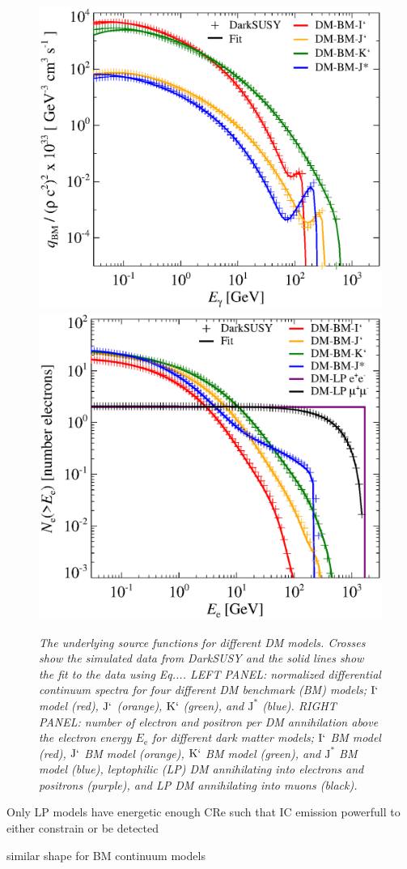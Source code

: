 \documentclass[10pt,aps,pra,reprint,amsmath,amsfonts,amssymb,showpacs]{revtex4-1}
\newcommand{\rmn}{\mathrm}
\newcommand{\ee}{E_\rmn{e}}
\newcommand{\Kp}{\rmn{K}`}
\newcommand{\Ip}{\rmn{I}`}
\newcommand{\Js}{\rmn{J}^*}
\newcommand{\Jp}{\rmn{J}`}
\begin{document}
\clearpage
\appendix

\begin{figure}
\begin{minipage}{2.0\columnwidth}
 \includegraphics[width=0.49\columnwidth]{figures/fit.ds.flux.eps}
 \includegraphics[width=0.49\columnwidth]{figures/fit.epflux.int.eps}
\caption{\it The underlying source functions for different DM
  models. Crosses show the simulated data from DarkSUSY and the solid
  lines show the fit to the data using Eq.... LEFT PANEL: normalized
  differential continuum spectra for four different DM benchmark (BM)
  models; $\Ip$ model (red), $\Jp$ (orange), $\Kp$ (green), and
  $\Js$ (blue). RIGHT PANEL: number of electron and positron per DM
  annihilation above the electron energy $\ee$ for different dark
  matter models; $\Ip$ BM model (red), $\Jp$ BM model (orange),
  $\Kp$ BM model (green), and $\Js$ BM model (blue), leptophilic (LP)
  DM annihilating into electrons and positrons (purple), and LP DM
  annihilating into muons (black).}
 \label{fig17}
\end{minipage}
\end{figure}
Only LP models have energetic enough CRe such that IC emission
powerfull to either constrain or be detected

similar shape for BM continuum models
\end{document}

